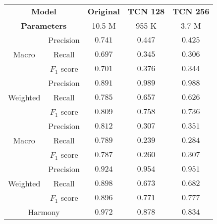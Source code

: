 \begin{tabular}{cc|ccc}
    \multicolumn{2}{c|}{\textbf{Model}} & \textbf{Original} & \textbf{TCN 128} & \textbf{TCN 256} \\
    \multicolumn{2}{c|}{\textbf{Parameters}} & 10.5 M & 955 K & 3.7 M \\\hline
    \multirow{3}{*}{Macro}    & Precision   & $\mathbf{0.741}$ & $0.447$          & $0.425$ \\
    & Recall      & $\mathbf{0.697}$ & $0.345$          & $0.306$ \\
    & $F_1$ score & $\mathbf{0.701}$ & $0.376$          & $0.344$ \\\hline
    \multirow{3}{*}{Weighted} & Precision   & $0.891$          & $\mathbf{0.989}$ & $0.988$ \\
    & Recall      & $\mathbf{0.785}$ & $0.657$          & $0.626$ \\
    & $F_1$ score & $\mathbf{0.809}$ & $0.758$          & $0.736$ \\\hline
    \multirow{3}{*}{Macro}    & Precision   & $\mathbf{0.812}$ & $0.307$          & $0.351$ \\
    & Recall      & $\mathbf{0.789}$ & $0.239$          & $0.284$ \\
    & $F_1$ score & $\mathbf{0.787}$ & $0.260$          & $0.307$ \\\hline
    \multirow{3}{*}{Weighted} & Precision   & $0.924$          & $\mathbf{0.954}$ & $0.951$ \\
    & Recall      & $\mathbf{0.898}$ & $0.673$          & $0.682$ \\
    & $F_1$ score & $\mathbf{0.896}$ & $0.771$          & $0.777$ \\\hline
    \multicolumn{2}{c|}{Harmony} & $\mathbf{0.972}$ & $0.878$ & $0.834$ \\
\end{tabular}

